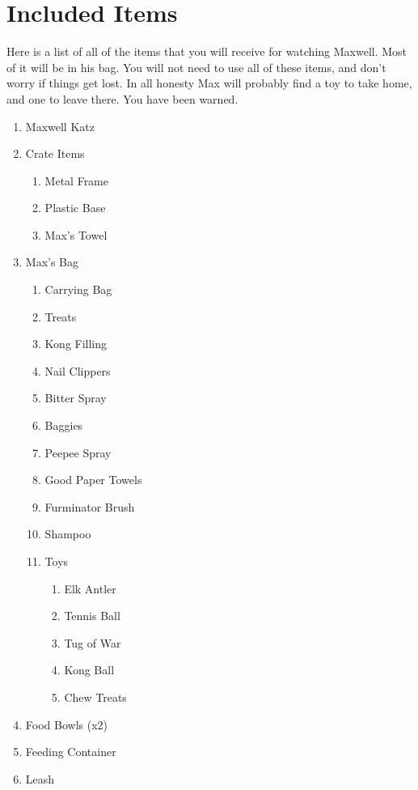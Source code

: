 \documentclass[pdftex,12pt]{article}
\begin{document}
\bigskip

\clearpage
\newpage
\section{Included Items}

Here is a list of all of the items that you will receive for watching Maxwell.
Most of it will be in his bag. You will not need to use all of these items, and
don't worry if things get lost. In all honesty Max will probably find a toy to
take home, and one to leave there. You have been warned.

\begin{enumerate}\label{itm:included_items}
    \item Maxwell Katz
    \item Crate Items
        \begin{enumerate}
            \item Metal Frame
            \item Plastic Base
            \item Max's Towel
        \end{enumerate}
    \item Max's Bag
        \begin{enumerate}
            \item Carrying Bag
            \item Treats
            \item Kong Filling
            \item Nail Clippers
            \item Bitter Spray
            \item Baggies
            \item Peepee Spray
            \item Good Paper Towels
            \item Furminator Brush
            \item Shampoo
            \item Toys
                \begin{enumerate}
                    \item Elk Antler
                    \item Tennis Ball
                    \item Tug of War
                    \item Kong Ball
                    \item Chew Treats
                \end{enumerate}
        \end{enumerate}
    \item Food Bowls (x2)
    \item Feeding Container
    \item Leash
\end{enumerate}
\end{document}
